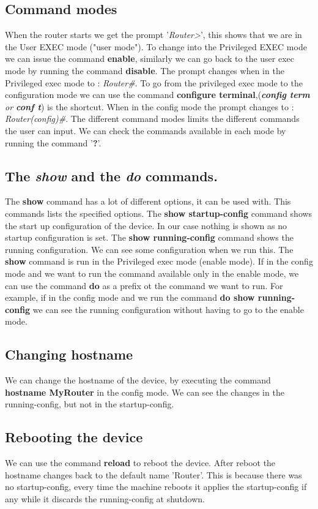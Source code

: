 \documentclass{article}
\begin{document}
\subsection{Command modes}
When the router starts we get the prompt '\textit{Router\textgreater}', this shows that we are in the User EXEC mode ("user mode"). To change into the Privileged EXEC mode we can issue the command \textbf{enable}, similarly we can go back to the user exec mode by running the command \textbf{disable}. The prompt changes when in the Privileged exec mode to : \textit{Router\#}. To go from the privileged exec mode to the configuration mode we can use the command \textbf{configure terminal},(\textit{\textbf{config term} or \textbf{conf t}}) is the shortcut. When in the config mode the prompt changes to : \textit{Router(config)\#}. The different command modes limits the different commands the user can input. We can check the commands available in each mode by running the command '\textbf{?}'.

\subsection{The \textit{show} and the \textit{do} commands.}
The \textbf{show} command has a lot of different options, it can be used with. This commands lists the specified options. The \textbf{show startup-config} command shows the start up configuration of the device. In our case nothing is shown as no startup configuration is set. The \textbf{show running-config} command shows the running configuration. We can see some configuration when we run this. The \textbf{show} command is run in the Privileged exec mode (enable mode). If in the config mode and we want to run the command available only in the enable mode, we can use the command \textbf{do} as a prefix ot the command we want to run. For example, if in the config mode and we run the command \textbf{do show running-config} we can see the running configuration without having to go to the enable mode.

\subsection{Changing hostname}
We can change the hostname of the device, by executing the command \textbf{hostname MyRouter} in the config mode. We can see the changes in the running-config, but not in the startup-config.

\subsection{Rebooting the device}
We can use the command \textbf{reload} to reboot the device. After reboot the hostname changes back to the default name 'Router'. This is because there was no startup-config, every time the machine reboots it applies the startup-config if any while it discards the running-config at shutdown. 
\end{document}
